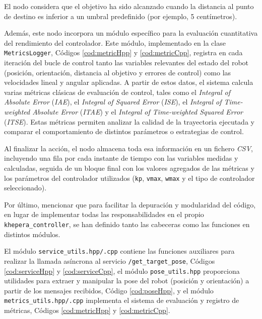 \begin{itemize}
El nodo considera que el objetivo ha sido alcanzado cuando la distancia al punto 
de destino es inferior a un umbral predefinido (por ejemplo, 5 centímetros). 

Además, este nodo incorpora un módulo específico para la 
evaluación cuantitativa del rendimiento del controlador. Este módulo, implementado 
en la clase \texttt{MetricsLogger}, Códigos \ref{cod:metricHpp} y \ref{cod:metricCpp}, registra en cada iteración del bucle de control 
tanto las variables relevantes del estado del robot (posición, orientación, 
distancia al objetivo y errores de control) como las velocidades lineal y angular 
aplicadas. A partir de estos datos, el sistema calcula varias métricas clásicas de 
evaluación de control, tales como el \textit{Integral of Absolute Error} (\textit{IAE}), 
el \textit{Integral of Squared Error} (\textit{ISE}), el \textit{Integral of Time-weighted 
Absolute Error} (\textit{ITAE}) y el \textit{Integral of Time-weighted Squared Error} (\textit{ITSE}). 
Estas métricas permiten analizar la calidad de la trayectoria ejecutada y comparar 
el comportamiento de distintos parámetros o estrategias de control.

Al finalizar la acción, el nodo almacena toda esa información en un fichero \textit{CSV}, 
incluyendo una fila por cada instante de tiempo con las variables medidas y 
calculadas, seguida de un bloque final con los valores agregados de las métricas 
y los parámetros del controlador utilizados (\texttt{kp}, \texttt{vmax}, 
\texttt{wmax} y el tipo de controlador seleccionado).

Por último, mencionar que para facilitar la depuración y modularidad del código,
en lugar de implementar todas las responsabilidades en el propio \texttt{khepera\_controller},
se han definido tanto las cabeceras como las funciones en distintos módulos.

El módulo \texttt{service\_utils.hpp/.cpp} contiene las funciones auxiliares 
para realizar la llamada asíncrona al servicio \texttt{/get\_target\_pose}, 
Códigos \ref{cod:serviceHpp} y \ref{cod:serviceCpp}, el módulo \texttt{pose\_utils.hpp} proporciona utilidades para 
extraer y manipular la pose del robot (posición y orientación) a partir de los 
mensajes recibidos, Código \ref{cod:poseHpp}, y el módulo \texttt{metrics\_utils.hpp/.cpp} 
implementa el sistema de evaluación y registro de métricas, Códigos \ref{cod:metricHpp}
y \ref{cod:metricCpp}. 
    
\end{itemize}

